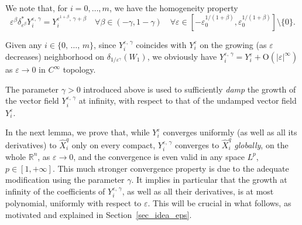 \documentclass[AHL,Unicode,published]{cedram}
\newcommand*\R{\mathbb{R}}
\newcommand{\rmO}{\mathrm{O}}
\let\oldforall\forall
\renewcommand*{\forall}{\mathrel{\oldforall}}
\begin{document}
We note that, for $i=0,\ldots,m$, we have the homogeneity property
\begin{equation}\label{homogYiepsgamma}
\varepsilon^\beta \delta_{\varepsilon^\beta}^* Y_i^{\varepsilon,\,\gamma} = Y_i^{\varepsilon^{1+\beta},\,\gamma+\beta} \quad \forall\beta\in(-\gamma,1-\gamma) \quad\forall \varepsilon\in \left[-\varepsilon_0^{1/(1+\beta)},\varepsilon_0^{1/(1+\beta)} \right] \setminus\{0\}.
\end{equation}


\begin{rema}\label{rem_comp_Yiepsgamma_Yieps}
Given any $i\in\{0,\,\ldots,\,m\}$, since $Y_i^{\varepsilon,\,\gamma}$ coincides with $Y_i^\varepsilon$ on the growing (as $\varepsilon$ decreases) neighborhood on $\delta_{1/\varepsilon^\gamma}(W_1)$, we obviously have $Y_i^{\varepsilon,\,\gamma} = Y_i^\varepsilon + \rmO(\vert\varepsilon\vert^\infty)$ as $\varepsilon\rightarrow 0$ in $C^\infty$ topology.
\end{rema}



The parameter $\gamma>0$ introduced above is used to sufficiently \emph{damp} the growth of the vector field $Y_i^{\varepsilon,\,\gamma}$ at infinity, with respect to that of the undamped vector field $Y_i^\varepsilon$.

In the next lemma, we prove that, while $Y_i^\varepsilon$ converges uniformly (as well as all its derivatives) to $\widehat{X}_i^{q}$ only on every compact, $Y_i^{\varepsilon,\,\gamma}$ converges to $\widehat{X}_i^{q}$ \emph{globally}, on the whole $\R^n$, as $\varepsilon\rightarrow 0$, and the convergence is even valid in any space $L^p$, $p\in[1,+\infty]$. This much stronger convergence property is due to the adequate modification using the parameter $\gamma$. It implies in particular that the growth at infinity of the coefficients of $Y_i^{\varepsilon,\,\gamma}$, as well as all their derivatives, is at most polynomial, uniformly with respect to $\varepsilon$. This will be crucial in what follows, as motivated and explained in Section~\ref{sec_idea_eps}.
\end{document}
